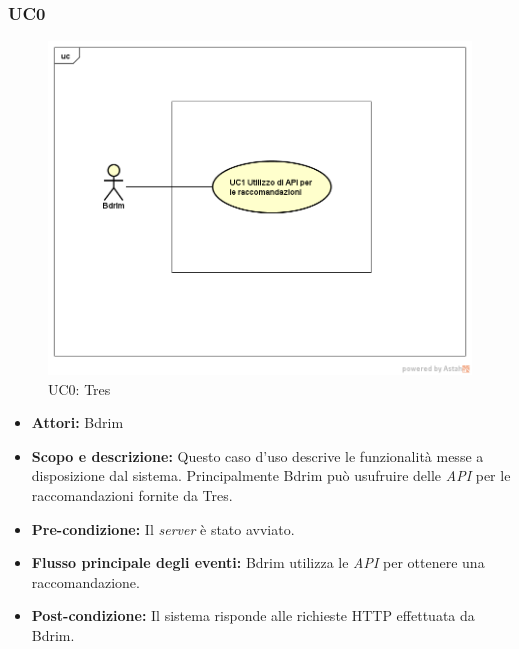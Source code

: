 \subsubsection{UC0}
\begin{figure}[h]
\centering
\includegraphics[scale=0.42]{immagini/UC0a}
\caption{UC0: Tres}
\label{fig:UC0}
\end{figure}
\begin{itemize}
\item \textbf{Attori:} Bdrim
\item \textbf{Scopo e descrizione:} Questo caso d'uso descrive le funzionalità messe a disposizione dal sistema. Principalmente Bdrim può usufruire delle \emph{API} per le raccomandazioni fornite da Tres.
\item \textbf{Pre-condizione:} Il \emph{server} è stato avviato.
\item \textbf{Flusso principale degli eventi:} Bdrim utilizza le \emph{API} per ottenere una raccomandazione.
\item \textbf{Post-condizione:} Il sistema risponde alle richieste HTTP effettuata da Bdrim.
\end{itemize}
\newpage
